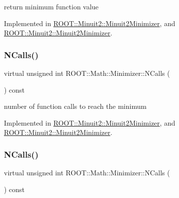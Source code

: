 return minimum function value 



Implemented in \mbox{\hyperlink{classROOT_1_1Minuit2_1_1Minuit2Minimizer_a4a1c7fc174527aefab3d8c87bf8c0672}{R\+O\+O\+T\+::\+Minuit2\+::\+Minuit2\+Minimizer}}, and \mbox{\hyperlink{classROOT_1_1Minuit2_1_1Minuit2Minimizer_a4a1c7fc174527aefab3d8c87bf8c0672}{R\+O\+O\+T\+::\+Minuit2\+::\+Minuit2\+Minimizer}}.

\mbox{\label{classROOT_1_1Math_1_1Minimizer_abf8b2e97d47843a1fde7a54cb51c1f0e}} 
\subsubsection{\texorpdfstring{NCalls()}{NCalls()}\hspace{0.1cm}{\footnotesize\ttfamily [1/2]}}
{\footnotesize\ttfamily virtual unsigned int R\+O\+O\+T\+::\+Math\+::\+Minimizer\+::\+N\+Calls (\begin{DoxyParamCaption}{ }\end{DoxyParamCaption}) const\hspace{0.3cm}{\ttfamily [pure virtual]}}



number of function calls to reach the minimum 



Implemented in \mbox{\hyperlink{classROOT_1_1Minuit2_1_1Minuit2Minimizer_ab5faf7c3dc0b3743eee8352c62a6ccfd}{R\+O\+O\+T\+::\+Minuit2\+::\+Minuit2\+Minimizer}}, and \mbox{\hyperlink{classROOT_1_1Minuit2_1_1Minuit2Minimizer_ab5faf7c3dc0b3743eee8352c62a6ccfd}{R\+O\+O\+T\+::\+Minuit2\+::\+Minuit2\+Minimizer}}.

\mbox{\label{classROOT_1_1Math_1_1Minimizer_abf8b2e97d47843a1fde7a54cb51c1f0e}} 
\subsubsection{\texorpdfstring{NCalls()}{NCalls()}\hspace{0.1cm}{\footnotesize\ttfamily [2/2]}}
{\footnotesize\ttfamily virtual unsigned int R\+O\+O\+T\+::\+Math\+::\+Minimizer\+::\+N\+Calls (\begin{DoxyParamCaption}{ }\end{DoxyParamCaption}) const\hspace{0.3cm}{\ttfamily [pure virtual]}}



